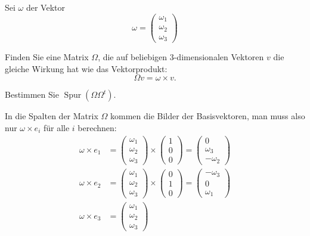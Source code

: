 Sei $\omega$ der Vektor
\[
\omega=\begin{pmatrix}\omega_1\\\omega_2\\\omega_3\end{pmatrix}
\]
\begin{teilaufgaben}
\item
Finden Sie eine Matrix $\Omega$, die auf beliebigen $3$-dimensionalen Vektoren $v$ die gleiche
Wirkung hat wie das Vektorprodukt:
\[
\Omega v=\omega\times v.
\]
\item Bestimmen Sie $\operatorname{Spur}(\Omega\Omega^t)$.
\end{teilaufgaben}


\begin{loesung}
\begin{teilaufgaben}
\item In die Spalten der Matrix $\Omega$ kommen die Bilder der Basisvektoren,
man muss also nur $\omega\times e_i$ für alle $i$ berechnen:
\begin{align*}
\omega\times e_1
&=
\begin{pmatrix}\omega_1\\\omega_2\\\omega_3\end{pmatrix}
\times
\begin{pmatrix}1\\0\\0\end{pmatrix}
=
\begin{pmatrix}0\\\omega_3\\-\omega_2\end{pmatrix}
\\
\omega\times e_2
&=
\begin{pmatrix}\omega_1\\\omega_2\\\omega_3\end{pmatrix}
\times
\begin{pmatrix}0\\1\\0\end{pmatrix}
=
\begin{pmatrix}-\omega_3\\0\\\omega_1\end{pmatrix}
\\
\omega\times e_3
&=
\begin{pmatrix}\omega_1\\\omega_2\\\omega_3\end{pmatrix}

\end{align*}
\end{teilaufgaben}
\end{loesung}
